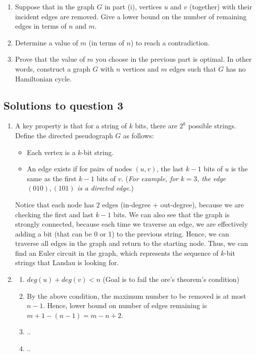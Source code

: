\documentclass{article}
\begin{document}
\begin{enumerate}[label=(\alph*)]
\begin{enumerate}[label=(\roman*)]
              \item Suppose that in the graph $G$ in part (i), vertices $u$ and $v$ (together) with their incident edges are removed. Give a lower bound on the number of remaining edges in terms of $n$ and $m$.

              \item Determine a value of $m$ (in terms of $n$) to reach a contradiction.

              \item Prove that the value of $m$ you choose in the previous part is optimal. In other words, construct a graph $G$ with $n$ vertices and $m$ edges such that $G$ has no Hamiltonian cycle.
          \end{enumerate}
\end{enumerate}

\subsection*{Solutions to question 3}

\begin{enumerate}[label=(\alph*)]
    \item A key property is that for a string of $k$ bits, there are $2^k$ possible strings. Define the directed pseudograph $G$ as follows:
          \begin{itemize}
              \item Each vertex is a $k$-bit string.
              \item An edge exists if for pairs of nodes $(u,v)$, the last $k-1$ bits of $u$ is the same as the first $k-1$ bits of $v$. (\textit{For example, for $k=3$, the edge $(010), (101)$ is a directed edge.})
          \end{itemize}
          Notice that each node has $2$ edges (in-degree + out-degree), because we are checking the first and last $k-1$ bits. We can also see that the graph is strongly connected, because each time we traverse an edge, we are effectively adding a bit (that can be 0 or 1) to the previous string. Hence, we can traverse all edges in the graph and return to the starting node. Thus, we can find an Euler circuit in the graph, which represents the sequence of $k$-bit strings that Landau is looking for.
    \item
          \begin{enumerate}
              \item $deg(u)+deg(v)< n$ (Goal is to fail the ore's theorem's condition)
              \item By the above condition, the maximum number to be removed is at most $n-1$. Hence, lower bound on number of edges remaining is $m+1 - (n-1) = m - n + 2$.
              \item ..
              \item ..
          \end{enumerate}
\end{enumerate}
\end{document}
